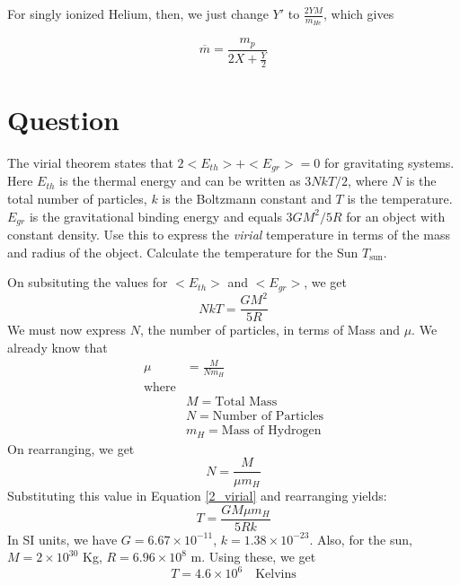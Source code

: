 \documentclass[paper=a4, fontsize=11pt]{scrartcl} %
\numberwithin{equation}{section} %
\numberwithin{figure}{section} %
\numberwithin{table}{section} %
\begin{document}
	For singly ionized Helium, then, we just change $Y'$ to $\frac{2YM}{m_{He}}$, which gives

	\begin{equation}
		\overline{m} = \frac{m_p}{2X + \frac{Y}{2}}
	\end{equation}

\section{Question}
	The virial theorem states that $2<E_{th}> + <E_{gr}> = 0$ for gravitating systems. Here $E_{th}$ is the thermal energy and can be written as $3NkT/2$, where $N$ is the total number of particles, $k$ is the Boltzmann constant and $T$ is the temperature. $E_{gr}$ is the gravitational binding energy and equals $3GM^2/5R$ for an object with constant density. Use this to express the \emph{virial} temperature in terms of the mass and radius of the object. Calculate the temperature for the Sun $T_\text{sun}$.\\
	\par
	On subsituting the values for $<E_{th}>$ and $<E_{gr}>$, we get
	\begin{equation}
		NkT = \frac{GM^2}{5R}
		\label{2_virial}
	\end{equation}
	We must now express $N$, the number of particles, in terms of Mass and $\mu$. We already know that 
	\begin{equation}
	\begin{split}
		\mu & =\frac{M}{N m_H} \\
		\text{where}\\
		& M=\text{Total Mass} \\
		& N=\text{Number of Particles} \\
		& m_H=\text{Mass of Hydrogen}
	\end{split}
	\end{equation}
	On rearranging, we get
	\begin{equation}
		N=\frac{M}{\mu m_H}
	\end{equation}
	Substituting this value in Equation \ref{2_virial} and rearranging yields:
	\begin{equation}
		T = \frac{GM \mu m_H}{5Rk}
	\end{equation}
	In SI units, we have $G=6.67 \times 10^{-11}$, $k=1.38 \times 10^{-23}$. Also, for the sun, $M=2\times 10^{30}$ Kg, $R=6.96\times 10^8$ m. Using these, we get 
	\begin{equation}
		T=4.6\times10^6 \quad \text{Kelvins}
	\end{equation}
\end{document}
